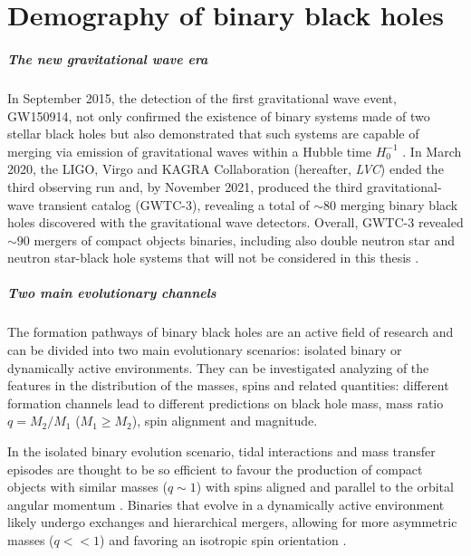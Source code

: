 \documentclass[a4paper,titlepage]{book}     	%
\begin{document}
\tableofcontents
{}

\mainmatter

\chapter{Demography of binary black holes}\label{ch:GW}

\paragraph{The new gravitational wave era} In September 2015, the detection of the first gravitational wave event, GW150914, not only confirmed the existence of binary systems made of two stellar black holes but also demonstrated that such systems are capable of merging via emission of gravitational waves within a Hubble time $H_0^{-1}$ \cite{Abbott2016firstGW}. In March 2020, the LIGO, Virgo and KAGRA Collaboration (hereafter, \emph{LVC}) ended the third observing run and, by November 2021, produced the third gravitational-wave transient catalog (GWTC-3), revealing a total of $\sim 80$ merging binary black holes discovered with the gravitational wave detectors. Overall, GWTC-3 revealed $\sim 90$ mergers of compact objects binaries, including also double neutron star and neutron star-black hole systems that will not be considered in this thesis \cite{GWTC-3}. 


\paragraph{Two main evolutionary channels}
The formation pathways of binary black holes are an active field of research and can be divided into two main evolutionary scenarios: isolated binary or dynamically active environments. They can be investigated analyzing of the features in the distribution of the masses, spins and related quantities: different formation channels lead to different predictions on black hole mass, mass ratio $q=M_2/M_1$ ($M_1 \geq M_2$), spin alignment and magnitude.
 
In the isolated binary evolution scenario, tidal interactions and mass transfer episodes are thought to be so efficient to favour the production of compact objects with similar masses ($q \sim 1$) \cite{giacobbomapelli2018_mobse_fryer} with spins aligned and parallel to the orbital angular momentum \cite{Kalogera2000_spinaligned}. Binaries that evolve in a dynamically active environment likely undergo exchanges and hierarchical mergers, allowing for more asymmetric masses ($q << 1$) \cite{Rastello2021_dynamics} and favoring an isotropic spin orientation \cite{Rodriguez2016_BHspins}.
\end{document}
